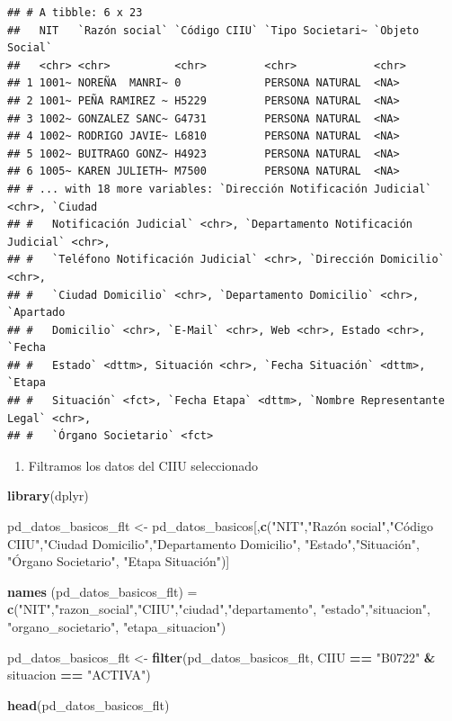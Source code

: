 \documentclass[
  11pt,
]{article}
\newenvironment{Shaded}{\begin{snugshade}}{\end{snugshade}}
\newcommand{\KeywordTok}[1]{\textcolor[rgb]{0.13,0.29,0.53}{\textbf{#1}}}
\newcommand{\NormalTok}[1]{#1}
\newcommand{\OperatorTok}[1]{\textcolor[rgb]{0.81,0.36,0.00}{\textbf{#1}}}
\newcommand{\StringTok}[1]{\textcolor[rgb]{0.31,0.60,0.02}{#1}}
\providecommand{\tightlist}{%
  \setlength{\itemsep}{0pt}\setlength{\parskip}{0pt}}
\begin{document}
\begin{verbatim}
## # A tibble: 6 x 23
##   NIT   `Razón social` `Código CIIU` `Tipo Societari~ `Objeto Social`
##   <chr> <chr>          <chr>         <chr>            <chr>          
## 1 1001~ NOREÑA  MANRI~ 0             PERSONA NATURAL  <NA>           
## 2 1001~ PEÑA RAMIREZ ~ H5229         PERSONA NATURAL  <NA>           
## 3 1002~ GONZALEZ SANC~ G4731         PERSONA NATURAL  <NA>           
## 4 1002~ RODRIGO JAVIE~ L6810         PERSONA NATURAL  <NA>           
## 5 1002~ BUITRAGO GONZ~ H4923         PERSONA NATURAL  <NA>           
## 6 1005~ KAREN JULIETH~ M7500         PERSONA NATURAL  <NA>           
## # ... with 18 more variables: `Dirección Notificación Judicial` <chr>, `Ciudad
## #   Notificación Judicial` <chr>, `Departamento Notificación Judicial` <chr>,
## #   `Teléfono Notificación Judicial` <chr>, `Dirección Domicilio` <chr>,
## #   `Ciudad Domicilio` <chr>, `Departamento Domicilio` <chr>, `Apartado
## #   Domicilio` <chr>, `E-Mail` <chr>, Web <chr>, Estado <chr>, `Fecha
## #   Estado` <dttm>, Situación <chr>, `Fecha Situación` <dttm>, `Etapa
## #   Situación` <fct>, `Fecha Etapa` <dttm>, `Nombre Representante Legal` <chr>,
## #   `Órgano Societario` <fct>
\end{verbatim}

\begin{enumerate}
\def\labelenumi{\arabic{enumi}.}
\setcounter{enumi}{1}
\tightlist
\item
  Filtramos los datos del CIIU seleccionado
\end{enumerate}

\begin{Shaded}
\begin{Highlighting}[]
\KeywordTok{library}\NormalTok{(dplyr)}

\NormalTok{pd_datos_basicos_flt <-}\StringTok{ }\NormalTok{pd_datos_basicos[,}\KeywordTok{c}\NormalTok{(}\StringTok{"NIT"}\NormalTok{,}\StringTok{"Razón social"}\NormalTok{,}\StringTok{"Código CIIU"}\NormalTok{,}\StringTok{"Ciudad Domicilio"}\NormalTok{,}\StringTok{"Departamento Domicilio"}\NormalTok{, }\StringTok{"Estado"}\NormalTok{,}\StringTok{"Situación", "}\NormalTok{Órgano Societario}\StringTok{", "}\NormalTok{Etapa Situación")]}

\KeywordTok{names}\NormalTok{ (pd_datos_basicos_flt) =}\StringTok{ }\KeywordTok{c}\NormalTok{(}\StringTok{"NIT"}\NormalTok{,}\StringTok{"razon_social"}\NormalTok{,}\StringTok{"CIIU"}\NormalTok{,}\StringTok{"ciudad"}\NormalTok{,}\StringTok{"departamento"}\NormalTok{, }\StringTok{"estado"}\NormalTok{,}\StringTok{"situacion"}\NormalTok{, }\StringTok{"organo_societario"}\NormalTok{,}
                                 \StringTok{"etapa_situacion"}\NormalTok{)}

\NormalTok{pd_datos_basicos_flt <-}\StringTok{ }\KeywordTok{filter}\NormalTok{(pd_datos_basicos_flt, CIIU }\OperatorTok{==}\StringTok{ "B0722"} \OperatorTok{&}\StringTok{ }\NormalTok{situacion }\OperatorTok{==}\StringTok{ "ACTIVA"}\NormalTok{)}

\KeywordTok{head}\NormalTok{(pd_datos_basicos_flt)}
\end{Highlighting}
\end{Shaded}
\end{document}
